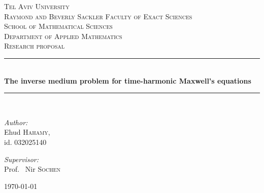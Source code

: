 \documentclass[12pt,twoside]{report}
\newcommand{\HRule}{\rule{\linewidth}{0.5mm}}
\begin{document}
\begin{titlepage}



\begin{center}

\textsc{ \LARGE
Tel Aviv University \\[1.5cm]
}
\textsc{\Large
Raymond and Beverly Sackler Faculty of Exact Sciences \\ [0.4cm]
School of Mathematical Sciences \\
Department of Applied Mathematics
} \\[1.0cm]
\textsc{Research proposal}

\HRule \\[0.4cm]
{ \huge \bfseries The inverse medium problem for time-harmonic Maxwell's equations \\[0.4cm] } 
\HRule \\[1.5cm]
\hfill \break

\noindent
\begin{minipage}{0.4\textwidth}
\begin{flushleft} \large
\emph{Author:}\\
Ehud \textsc{Hahamy}, \\
id. 032025140
\end{flushleft}
\end{minipage}%
\begin{minipage}{0.4\textwidth}
\begin{flushright} \large
\emph{Supervisor:} \\
Prof. ~Nir \textsc{Sochen}
\end{flushright}
\end{minipage}

\vfill
{\large \today}




\end{center}






\end{titlepage}
\end{document}
